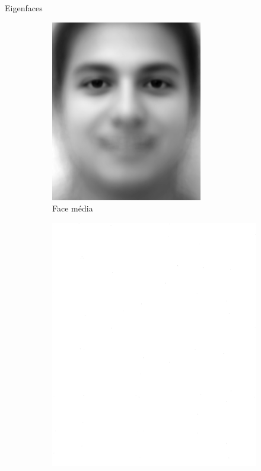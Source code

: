 \begin{frame}{Eigenfaces}
\begin{figure}[htbp]
\begin{subfigure}[t]{0.3\textwidth}
    \includegraphics[width=\textwidth]{imagens/face_media.png}
    \caption{Face média}
    \end{subfigure}
    \begin{subfigure}[t]{0.3\textwidth}
    \centering
    \includegraphics[width=\textwidth]{imagens/eigenfaces.png}

\end{subfigure}
\end{figure}
\end{frame}
